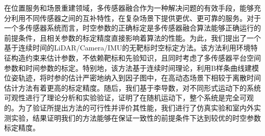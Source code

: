 
在位置服务和场景重建领域，多传感器融合作为一种解决问题的有效手段，能够充分利用不同传感器之间的互补特性，在复杂场景下提供更优、更可靠的服务。对于一个多传感器系统而言，时空参数的正确标定是多传感器融合算法能够正确运行的前提条件，且相关参数的标定精度直接影响着算法的性能。为此，我们提出了一个基于连续时间的LiDAR/Camera/IMU的无靶标时空标定方法。该方法利用环境特征构造约束来估计参数，不依赖靶标和先验知识，且同时考虑了多传感器平台空间参数和时间参数的标定。特别地，该方法基于连续时间理论，利用B样条曲线建模位姿轨迹，将时参的估计严密地纳入到因子图中，在高动态场景下相较于离散时间估计方法有着更高的标定精度。随后，我们基于李导数，对不同形式运动下的系统可观性进行了理论分析和实验验证，证明了在随机运动下，整个系统是完全可观的。为了验证所提出方法的可行性并评价其性能，我们进行了仿真实验和室内外实测实验，结果证明我们的方法能够在保证一致性的前提条件下达到较优的时空参数标定精度。